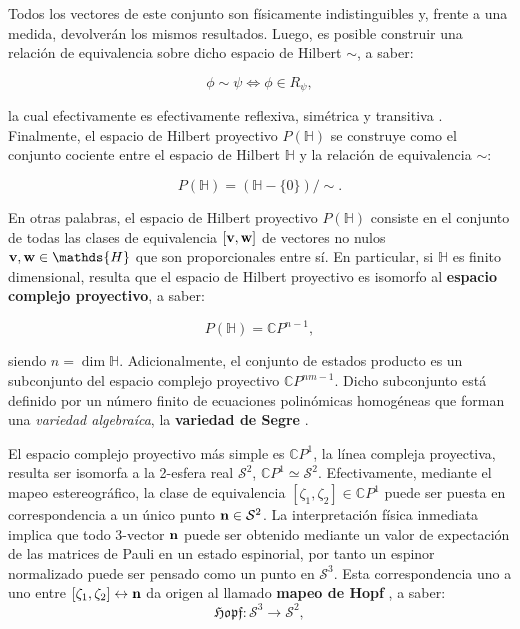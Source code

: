 \documentclass{report} %
\numberwithin{equation}{section}
\begin{document}
Todos los vectores de este conjunto son físicamente indistinguibles y, frente a una medida, devolverán los mismos resultados. Luego, es posible construir una relación de equivalencia sobre dicho espacio de Hilbert $\sim$, a saber:

$$
 \phi \sim \psi \Longleftrightarrow \phi \in R_{\psi},
$$

la cual efectivamente es efectivamente reflexiva, simétrica y transitiva \cite{munkres, GoldbartStone}. Finalmente, el espacio de Hilbert proyectivo $P(\mathds{H})$ se construye como el conjunto cociente entre el espacio de Hilbert $\mathds{H}$ y la relación de equivalencia $\sim$:

$$
P(\mathds{H}) = (\mathds{H}-\{0\})/\sim.
$$
 
En otras palabras, el espacio de Hilbert proyectivo $P(\mathds{H})$ consiste en el conjunto de todas las clases de equivalencia $[{\bf v}, {\bf w}]$ de vectores no nulos ${\bf v}, {\bf w} \in \mathds{H}$ que son proporcionales entre sí. En particular, si $\mathds{H}$ es finito dimensional, resulta que el espacio de Hilbert proyectivo es isomorfo al \textbf{espacio complejo proyectivo}, a saber:

\begin{equation}
    P(\mathds{H}) = \mathds{C}P^{n-1},
\end{equation}

siendo $n=\dim\mathds{H}$. Adicionalmente, el conjunto de estados producto es un subconjunto del espacio complejo proyectivo $\mathds{C}P^{nm-1}$. Dicho subconjunto está definido por un número finito de ecuaciones polinómicas homogéneas que forman una \textit{variedad algebraíca}, la \textbf{variedad de Segre} \cite{Hatcher:AT}. 

El espacio complejo proyectivo más simple es $\mathds{C}P^{1}$, la línea compleja proyectiva, resulta ser isomorfa a la 2-esfera real $\mathcal{S}^{2}$, $\mathds{C}P^{1} \simeq \mathcal{S}^{2}$. Efectivamente,
mediante el mapeo estereográfico, la clase de equivalencia $[\zeta_{1}, \zeta_{2}] \in \mathds{C}P^{1}$ puede ser puesta en correspondencia a un único punto ${\bf n} \in \mathcal{S}^{2}$. La interpretación física inmediata implica que todo 3-vector ${\bf n}$ puede ser obtenido mediante un valor de expectación de las matrices de Pauli en un estado espinorial, por tanto un espinor normalizado puede ser pensado como un punto en $\mathcal{S}^{3}$. Esta correspondencia uno a uno entre $[\zeta_1, \zeta_2] \leftrightarrow {\bf n}$ da origen al llamado \textbf{mapeo de Hopf} \cite{GoldbartStone}, a saber:
$$
\mathfrak{Hopf}: \mathcal{S}^{3} \rightarrow \mathcal{S}^{2},
$$
\end{document}
